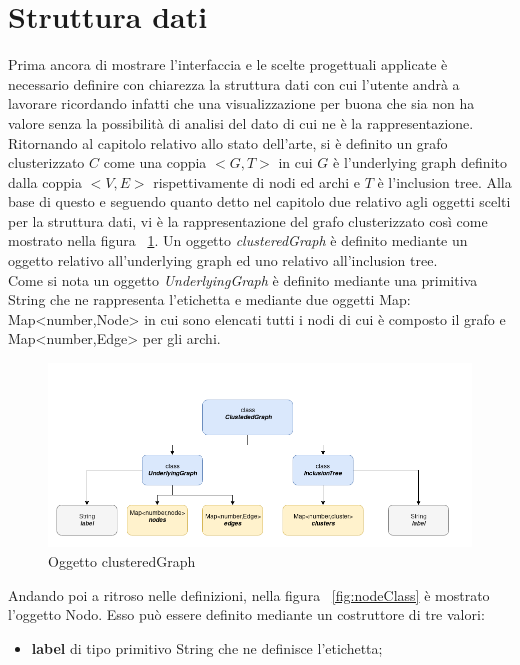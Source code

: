 \large{
\section{Struttura dati}
Prima ancora di mostrare l'interfaccia e le scelte progettuali applicate è necessario definire con chiarezza la struttura dati con cui l'utente andrà a lavorare ricordando infatti che una visualizzazione per buona che sia non ha valore senza la possibilità di analisi del dato di cui ne è la rappresentazione.
Ritornando al capitolo relativo allo stato dell'arte, si è definito un grafo clusterizzato $C$ come una coppia $<G,T>$ in cui $G$ è l'underlying graph definito dalla coppia $<V,E>$ rispettivamente di nodi ed archi e $T$ è l'inclusion tree. Alla base di questo e seguendo quanto detto nel capitolo due relativo agli oggetti scelti per la struttura dati, vi è la rappresentazione del grafo clusterizzato così come mostrato nella figura \figurename~\ref{fig:cgraphClass}. Un oggetto \textit{clusteredGraph} è definito mediante un oggetto relativo all'underlying graph ed uno relativo all'inclusion tree.\\
Come si nota un oggetto \textit{UnderlyingGraph} è definito mediante una primitiva String che ne rappresenta l'etichetta e mediante due oggetti Map: Map<number,Node> in cui sono elencati tutti i nodi di cui è composto il grafo e Map<number,Edge> per gli archi. 
\begin{figure}[!htb]
	\begin{center}
		\includegraphics[width=1 \linewidth]{figure/cgraphClass}
	\end{center}
	\caption{Oggetto clusteredGraph\label{fig:cgraphClass}}
\end{figure}
Andando poi a ritroso nelle definizioni, nella figura \figurename~\ref{fig:nodeClass} è mostrato l'oggetto Nodo. Esso può essere definito mediante un costruttore di tre valori:
\begin{itemize}
	\item \textbf{label} di tipo primitivo String che ne definisce l'etichetta;

\end{itemize}}
